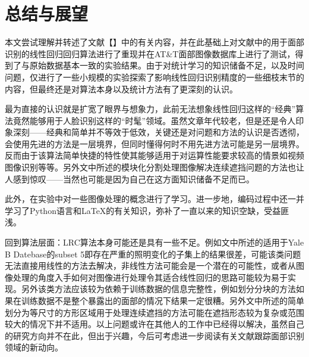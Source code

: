 \documentclass[UTF8]{ctexart}
\begin{document}
\section{总结与展望}\label{sec-4}
本文尝试理解并转述了文献【】中的有关内容，并在此基础上对文献中的用于面部识别的线性回归回归算法进行了重现并在AT\&T面部图像数据库上进行了测试，得到了与原始数据基本一致的实验结果。由于对统计学习的知识储备不足，以及时间问题，仅进行了一些小规模的实验探索了影响线性回归识别精度的一些细枝末节的内容，但最终还是对算法本身以及统计方法有了更深刻的认识。\par
最为直接的认识就是扩宽了眼界与想象力，此前无法想象线性回归这样的“经典”算法竟然能够用于人脸识别这样的“时髦”领域。虽然文章年代较老，但是还是令人印象深刻——经典和简单并不等效于低效，关键还是对问题和方法的认识是否透彻，会使用先进的方法是一层境界，但同时懂得何时不用先进方法可能是另一层境界。反而由于该算法简单快捷的特性使其能够适用于对运算性能要求较高的情景如视频图像识别等等。另外文中所述的模块化分割处理图像解决连续遮挡问题的方法也让人感到惊叹——当然也可能是因为自己在这方面知识储备不足而已。\par
此外，在实验中对一些图像处理的概念进行了学习。进一步地，编码过程中还一并学习了Python语言和LaTeX的有关知识，弥补了一直以来的知识空缺，受益匪浅。\par
回到算法层面：LRC算法本身可能还是具有一些不足。例如文中所述的适用于Yale B Datebase的subset 5即存在严重的照明变化的子集上的结果很差，可能该类问题无法直接用线性的方法去解决，非线性方法可能会是一个潜在的可能性，或者从图像处理的角度入手如何对图像进行处理令其适合线性回归的思路可能较为易于实现。另外该类方法应该较为依赖于训练数据的信息完整性，例如划分分块的方法如果在训练数据不是整个暴露出的面部的情况下结果一定很糟。另外文中所述的简单划分为等尺寸的方形区域用于处理连续遮挡的方法可能在遮挡形态较为复杂或范围较大的情况下并不适用。以上问题或许在其他人的工作中已经得以解决，虽然自己的研究方向并不在此，但出于兴趣，今后可考虑进一步阅读有关文献跟踪面部识别领域的新动向。
\appendix
\appendixpage
\addappheadtotoc

\printindex %
\end{document}

